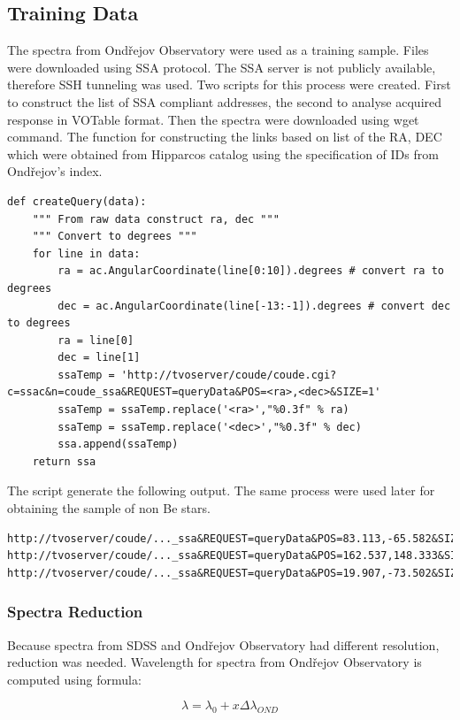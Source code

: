 \subsection{Training Data}
The spectra from Ondřejov Observatory were used as a training
sample. Files were downloaded using SSA protocol. The SSA server is
not publicly available, therefore SSH tunneling was used. Two scripts
for this process were created. First to construct the list of SSA
compliant addresses, the second to analyse acquired response in
VOTable format. Then the spectra were downloaded using wget
command. The function for constructing the links based on list of the
RA, DEC which were obtained from Hipparcos catalog using the
specification of IDs from Ondřejov's index.

\begin{lstlisting}
def createQuery(data):
    """ From raw data construct ra, dec """
    """ Convert to degrees """
    for line in data:
        ra = ac.AngularCoordinate(line[0:10]).degrees # convert ra to degrees
        dec = ac.AngularCoordinate(line[-13:-1]).degrees # convert dec to degrees
        ra = line[0]
        dec = line[1]
        ssaTemp = 'http://tvoserver/coude/coude.cgi?c=ssac&n=coude_ssa&REQUEST=queryData&POS=<ra>,<dec>&SIZE=1'
        ssaTemp = ssaTemp.replace('<ra>',"%0.3f" % ra)
        ssaTemp = ssaTemp.replace('<dec>',"%0.3f" % dec)
        ssa.append(ssaTemp)
    return ssa
\end{lstlisting}

The script generate the following output. The same process were used
later for obtaining the sample of non Be stars.

\begin{lstlisting}
http://tvoserver/coude/..._ssa&REQUEST=queryData&POS=83.113,-65.582&SIZE=60
http://tvoserver/coude/..._ssa&REQUEST=queryData&POS=162.537,148.333&SIZE=60
http://tvoserver/coude/..._ssa&REQUEST=queryData&POS=19.907,-73.502&SIZE=60
\end{lstlisting}


\subsubsection{Spectra Reduction}
Because spectra from SDSS and Ondřejov Observatory had different
resolution, reduction was needed. Wavelength for spectra from Ondřejov
Observatory is computed using formula:

\begin{equation}
  \label{eq:computeWave1}
  \lambda = \lambda_0 + x\Delta\lambda_{OND} 
\end{equation}

